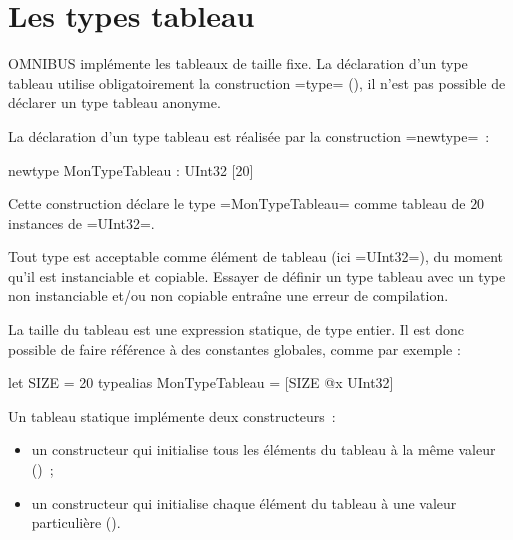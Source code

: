 




\chapter{Les types tableau}

OMNIBUS implémente les tableaux de taille fixe. La déclaration d'un type tableau utilise obligatoirement la construction \omnibus=type= (), il n'est pas possible de déclarer un type tableau anonyme.









La déclaration d'un type tableau est réalisée par la construction \omnibus=newtype=~:

\begin{OMNIBUS}
newtype MonTypeTableau : UInt32 [20]
\end{OMNIBUS}

Cette construction déclare le type \omnibus=MonTypeTableau= comme tableau de $20$ instances de \omnibus=UInt32=.

Tout type est acceptable comme élément de tableau (ici \omnibus=UInt32=), du moment qu'il est instanciable et copiable. Essayer de définir un type tableau avec un type non instanciable et/ou non copiable entraîne une erreur de compilation.

La taille du tableau est une expression statique, de type entier. Il est donc possible de faire référence à des constantes globales, comme par exemple :

\begin{OMNIBUS}
let SIZE = 20
typealias MonTypeTableau = [SIZE @x UInt32]
\end{OMNIBUS}



Un tableau statique implémente deux constructeurs~:
\begin{itemize}
  \item un constructeur qui initialise tous les éléments du tableau à la même valeur ()~;
  \item un constructeur qui initialise chaque élément du tableau à une valeur particulière ().
\end{itemize}




